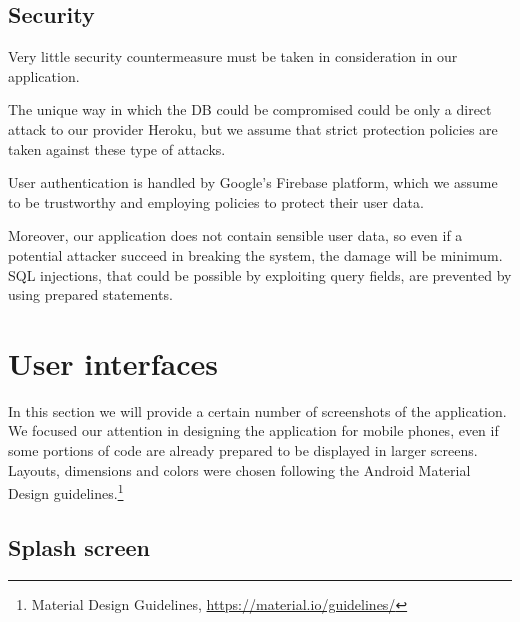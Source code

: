 \documentclass[a4paper]{scrreprt}
\begin{document}
\section{Security}
Very little security countermeasure must be taken in consideration in our application.

\bigskip The unique way in which the DB could be compromised could be only a direct attack to our provider Heroku, but we assume that strict protection policies are taken against these type of attacks.

User authentication is handled by Google's Firebase platform, which we assume to be trustworthy and employing policies to protect their user data.

Moreover, our application does not contain sensible user data, so even if a potential attacker succeed in breaking the system, the damage will be minimum. SQL injections, that could be possible by exploiting query fields, are prevented by using prepared statements.



\chapter{User interfaces}
In this section we will provide a certain number of screenshots of the application. We focused our attention in designing the application for mobile phones, even if some portions of code are already prepared to be displayed in larger screens. Layouts, dimensions and colors were chosen following the Android Material Design guidelines.\footnote{Material Design Guidelines, \url{https://material.io/guidelines/}}

\section{Splash screen}
\end{document}
